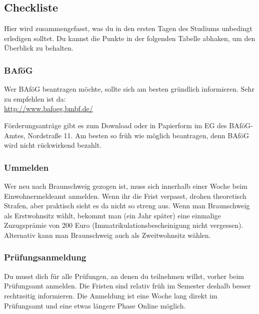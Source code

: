 
\subsection{Checkliste}
\label{checkliste}
\begin{multicols}{2}
	Hier wird zusammengefasst, was du in den ersten Tagen des Studiums
	unbedingt erledigen solltet. Du kannst die Punkte in der folgenden
	Tabelle abhaken, um den Überblick zu behalten.
\end{multicols}

\newpage
\begin{multicols}{2}
\subsubsection{BAföG}
	\label{todobafoeg}

	Wer BAföG beantragen möchte, sollte sich am besten gründlich informieren. Sehr zu empfehlen ist da: \\
	\url{http://www.bafoeg.bmbf.de/}
 
	Förderungsanträge gibt es zum Download oder in Papierform im EG des BAföG-Amtes, Nordstraße 11. Am besten so früh wie möglich beantragen, denn BAföG wird nicht rückwirkend bezahlt.


\subsubsection{Ummelden}
	\label{todoummelden}

	Wer neu nach Braunschweig gezogen ist, muss sich innerhalb einer Woche beim Einwohnermeldeamt anmelden. Wenn ihr die Frist verpasst, drohen theoretisch Strafen, aber praktisch sieht es da nicht so streng aus. Wenn man Braunschweig als Erstwohnsitz wählt, bekommt man (ein Jahr später) eine einmalige Zuzugsprämie von 200 Euro (Immatrikulationsbescheinigung nicht vergessen). Alternativ kann man Braunschweig auch als Zweitwohnsitz wählen.

\subsubsection{Prüfungsanmeldung}
	\label{todoanmeldung}

	Du musst dich für alle Prüfungen, an denen du teilnehmen willst, vorher beim Prüfungsamt anmelden. Die Fristen sind relativ früh im Semester deshalb besser rechtzeitig informieren. Die Anmeldung ist eine Woche lang direkt im Prüfungsamt und eine etwas längere Phase Online möglich.


\end{multicols}
